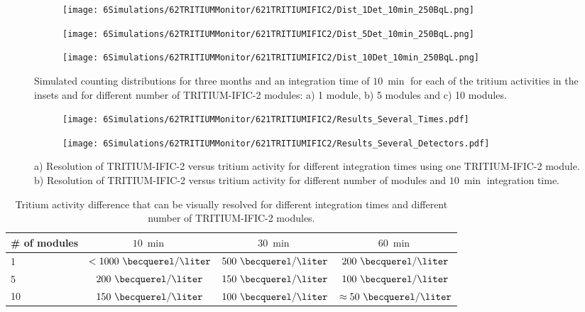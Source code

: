 \begin{figure}
\centering
    \begin{subfigure}[b]{0.6\textwidth}
    \centering
    \texttt{[image: 6Simulations/62TRITIUMMonitor/621TRITIUMIFIC2/Dist\_1Det\_10min\_250BqL.png]}  
    \caption{\label{subfig:1Det10min250BqLSD}}
    \end{subfigure}
    \hfill
    \begin{subfigure}[b]{0.6\textwidth}
    \centering
    \texttt{[image: 6Simulations/62TRITIUMMonitor/621TRITIUMIFIC2/Dist\_5Det\_10min\_250BqL.png]}  
    \caption{\label{subfig:5Det10min250BqLSD}}
    \end{subfigure}
    \hfill
    \begin{subfigure}[b]{0.6\textwidth}
    \centering
    \texttt{[image: 6Simulations/62TRITIUMMonitor/621TRITIUMIFIC2/Dist\_10Det\_10min\_250BqL.png]}  
    \caption{\label{subfig:10Det10min250BqLSD}}
    \end{subfigure}
 \caption{Simulated counting distributions for three months and an integration time of $10~\min$ for each of the tritium activities in the insets and for different number of TRITIUM-IFIC-2 modules: a) 1 module, b) 5 modules and c) 10 modules.}
 \label{fig:SeveralDet250BqL10min}
\end{figure}

\begin{figure}
\centering
    \begin{subfigure}[b]{1\textwidth}
    \centering
    \texttt{[image: 6Simulations/62TRITIUMMonitor/621TRITIUMIFIC2/Results\_Several\_Times.pdf]}  
    \caption{\label{subfig:ResolutionvsIntegrationCoutingTime}}
    \end{subfigure}
    \hfill
    \begin{subfigure}[b]{1\textwidth}
    \centering
    \texttt{[image: 6Simulations/62TRITIUMMonitor/621TRITIUMIFIC2/Results\_Several\_Detectors.pdf]}  
    \caption{\label{subfig:ResolutionvsNumberDetectors}}
    \end{subfigure}
 \caption{a) Resolution of TRITIUM-IFIC-2 versus tritium activity for different integration times using one TRITIUM-IFIC-2 module. b) Resolution of TRITIUM-IFIC-2 versus tritium activity for different number of modules and $10~\min$ integration time.}
 \label{fig:Resolution}
\end{figure}

\begin{table}[htbp]
\centering{}%
\begin{tabular}{lccc}
\toprule 
\# of modules & $10~\min$ & $30~\min$ & $60~\min$ \tabularnewline
\midrule
\midrule 
1 & $<1000~\becquerel/\liter$ & $500~\becquerel/\liter$ & $200~\becquerel/\liter$ \tabularnewline
5 & $200~\becquerel/\liter$ & $150~\becquerel/\liter$ & $100~\becquerel/\liter$ \tabularnewline
10 & $150~\becquerel/\liter$ & $100~\becquerel/\liter$ & $\approx 50~\becquerel/\liter$ \tabularnewline
\bottomrule
\end{tabular}
\caption{Tritium activity difference that can be visually resolved for different integration times and different number of TRITIUM-IFIC-2 modules.}
\label{tab:DifferentCasesOfTI2}
\end{table}

